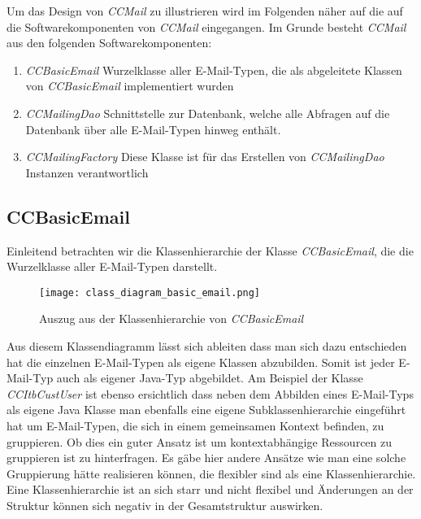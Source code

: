 \newline
Um das Design von \emph{CCMail} zu illustrieren wird im Folgenden näher auf die auf die Softwarekomponenten von \emph{CCMail} eingegangen. Im Grunde besteht \emph{CCMail} aus den folgenden Softwarekomponenten:
\begin{enumerate}
	\item\emph{CCBasicEmail}
	\newline
	Wurzelklasse aller E-Mail-Typen, die als abgeleitete Klassen von \emph{CCBasicEmail} implementiert wurden
	\item\emph{CCMailingDao}
	\newline
	Schnittstelle zur Datenbank, welche alle Abfragen auf die Datenbank über alle E-Mail-Typen hinweg enthält. 
	\item\emph{CCMailingFactory}
	\newline
	Diese Klasse ist für das Erstellen von \emph{CCMailingDao} Instanzen verantwortlich
\end{enumerate}
\newpage
\subsection{CCBasicEmail}
\label{sec:implementierung-ccbasic-mail}
Einleitend betrachten wir die Klassenhierarchie der Klasse \emph{CCBasicEmail}, die die Wurzelklasse aller E-Mail-Typen darstellt.
\begin{figure}[h]
\centering
\texttt{[image: class\_diagram\_basic\_email.png]} 
\caption{Auszug aus der Klassenhierarchie von \emph{CCBasicEmail}}
\label{fig:klassen-hierarchie-ccbasicemail}
\end{figure}
Aus diesem Klassendiagramm lässt sich ableiten dass man sich dazu entschieden hat die einzelnen E-Mail-Typen als eigene Klassen abzubilden. Somit ist jeder E-Mail-Typ auch als eigener Java-Typ abgebildet. Am Beispiel der Klasse \emph{CCItbCustUser} ist ebenso ersichtlich dass neben dem Abbilden eines E-Mail-Typs als eigene Java Klasse man ebenfalls eine eigene Subklassenhierarchie eingeführt hat um E-Mail-Typen, die sich in einem gemeinsamen Kontext befinden, zu gruppieren. Ob dies ein guter Ansatz ist um kontextabhängige Ressourcen zu gruppieren ist zu hinterfragen. Es gäbe hier andere Ansätze wie man eine solche Gruppierung hätte realisieren können, die flexibler sind als eine Klassenhierarchie. Eine Klassenhierarchie ist an sich starr und nicht flexibel und Änderungen an der Struktur können sich negativ in der Gesamtstruktur auswirken.
\newpage
